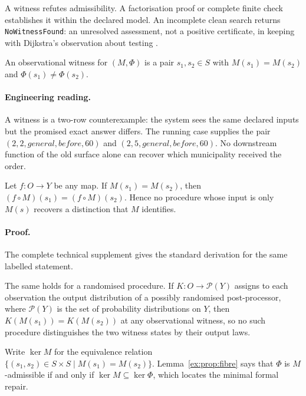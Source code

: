 \documentclass[twocolumn,envcountsect,envcountsame,natbib]{svjour3}
\newcommand{\code}[1]{\texttt{#1}}
\begin{document}
A witness refutes admissibility. A factorisation proof or complete finite check establishes it within the declared model. An incomplete clean search returns \code{NoWitnessFound}: an unresolved assessment, not a positive certificate, in keeping with Dijkstra's observation about testing \citep{dijkstra1970}.

\begin{definition}\label{ex:def:witness}
An observational witness for $(M,\Phi)$ is a pair $s_1,s_2 \in S$ with $M(s_1)=M(s_2)$ and $\Phi(s_1) \neq \Phi(s_2)$.
\end{definition}

\paragraph{Engineering reading.} A witness is a two-row counterexample: the system sees the same declared inputs but the promised exact answer differs. The running case supplies the pair $(2,2,\mathit{general},\mathit{before},60)$ and $(2,5,\mathit{general},\mathit{before},60)$. No downstream function of the old surface alone can recover which municipality received the order.

\begin{proposition}\label{ex:prop:norecovery}
Let $f:O\to Y$ be any map. If $M(s_1)=M(s_2)$, then $(f \circ M)(s_1)=(f \circ M)(s_2)$. Hence no procedure whose input is only $M(s)$ recovers a distinction that $M$ identifies.
\end{proposition}

\paragraph{Proof.} The complete technical supplement gives the standard derivation for the same labelled statement.

\begin{remark}\label{ex:cor:no-stochastic-recovery}
The same holds for a randomised procedure. If $K:O\to\mathcal{P}(Y)$ assigns to each observation the output distribution of a possibly randomised post-processor, where $\mathcal{P}(Y)$ is the set of probability distributions on $Y$, then $K(M(s_1))=K(M(s_2))$ at any observational witness, so no such procedure distinguishes the two witness states by their output laws.
\end{remark}

Write $\ker M$ for the equivalence relation $\{(s_1,s_2)\in S\times S\mid M(s_1)=M(s_2)\}$. Lemma~\ref{ex:prop:fibre} says that $\Phi$ is $M$-admissible if and only if $\ker M \subseteq \ker \Phi$, which locates the minimal formal repair.
\end{document}
